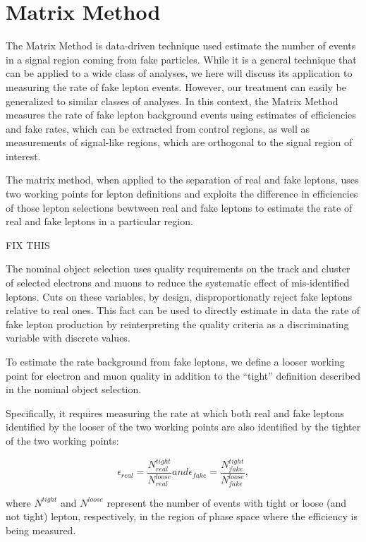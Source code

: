 
\section{Matrix Method}
\label{app:matrixmethod}

The Matrix Method is data-driven technique used estimate the number of events in a signal region coming from fake particles.
While it is a general technique that can be applied to a wide class of analyses, we here will discuss its application to measuring the rate of fake lepton events.
However, our treatment can easily be generalized to similar classes of analyses.
In this context, the Matrix Method measures the rate of fake lepton background events using estimates of efficiencies and fake rates, which can be extracted from control regions, as well as measurements of signal-like regions, which are orthogonal to the signal region of interest.

The matrix method, when applied to the separation of real and fake leptons,
uses two working points for lepton definitions and exploits the difference in efficiencies of 
those lepton selections bewtween real and fake leptons to estimate the rate of real and fake leptons
in a particular region.

FIX THIS

The nominal object selection uses quality requirements on the track and cluster of selected electrons and muons to reduce the systematic effect of mis-identified leptons.
Cuts on these variables, by design, disproportionatly reject fake leptons relative to real ones.
This fact can be used to directly estimate in data the rate of fake lepton production by reinterpreting the quality criteria as a discriminating variable with discrete values.

To estimate the rate background from fake leptons, we define a looser working point for electron and muon quality in addition to the ``tight'' definition described in the nominal object selection.

Specifically, it requires measuring the rate at which both real and fake leptons identified by the
looser of the two working points are also identified by the tighter of the two working points:

\begin{equation}
  \epsilon_{real} = \frac{N^{tight}_{real}}{N^{loose}_{real}} and \epsilon_{fake} = \frac{N^{tight}_{fake}}{N^{loose}_{fake}},
\end{equation}

where $N^{tight}$ and $N^{loose}$ represent the number of events with tight or loose (and not tight) lepton, respectively, in the region of phase space where the efficiency is being measured.


